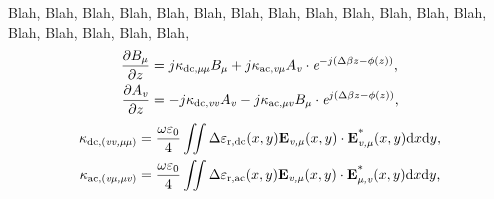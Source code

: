 \documentclass[lettersize,journal]{IEEEtran}
\begin{document}
    Blah, Blah, Blah, Blah, Blah, Blah, Blah, Blah, Blah, Blah, Blah, Blah, Blah, Blah, Blah, Blah, Blah, Blah, 
    \begin{align}
        \frac{\partial B_\text{\textit{\textmu}}}{\partial z} &= j\kappa_\text{dc,\textit{\textmu \textmu}}B_\text{\textit{\textmu}} + 
                j\kappa_\text{ac,\textit{v\textmu}}A_\text{\textit{v}}\cdot \textit{e}^{-j(\Delta \beta z - \phi (z))}\text{,}\label{eq:oneB} \\
        \frac{\partial A_\text{\textit{v}}}{\partial z} &= -j\kappa_\text{dc,\textit{vv}}A_\text{\textit{v}} - 
                j\kappa_\text{ac,\textit{\textmu v}}B_\text{\textit{\textmu}}
                \cdot \textit{e}^{j(\Delta \beta z - \phi (z))}\text{,}\label{eq:oneA}
    \end{align}
    \begin{align}
        \kappa_\text{dc,(\textit{vv,\textmu \textmu})} &= \frac{\omega \varepsilon_0}{4} \iint \Delta \varepsilon_\text{r,dc} (x,y)
            \textbf{E}_\text{\textit{v,\textmu}}(x,y)
            \cdot \textbf{E}_\text{\textit{v,\textmu}}^\text{*}(x,y)\text{d}x\text{d}y\text{,}\label{eq:two} \\
        \kappa_\text{ac,(\textit{v\textmu,\textmu v})} &= \frac{\omega \varepsilon_0}{4} \iint \Delta \varepsilon_\text{r,ac} (x,y)
            \textbf{E}_\text{\textit{v,\textmu}}(x,y)
            \cdot \textbf{E}_\text{\textit{\textmu ,v}}^\text{*}(x,y)\text{d}x\text{d}y\text{,}\label{eq:three}
    \end{align}
\end{document}
